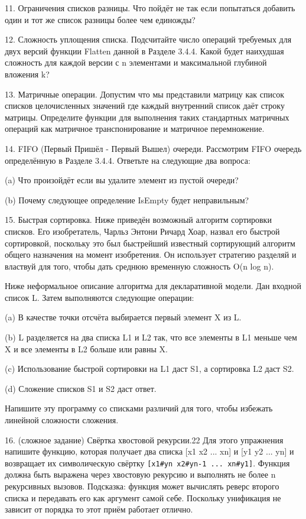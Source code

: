 11. Ограничения списков разницы. Что пойдёт не так если попытаться добавить один и тот же список разницы более чем единожды?

12. Сложность уплощения списка. Подсчитайте число операций требуемых для двух версий функции Flatten данной в Разделе 3.4.4. Какой будет наихудшая сложность для каждой версии с n элементами и максимальной глубиной вложения k?

13. Матричные операции. Допустим что мы представили матрицу как список списков целочисленных значений где каждый внутренний список даёт строку матрицы. Определите функции для выполнения таких стандартных матричных операций как матричное транспонирование и матричное перемножение.

14. FIFO (Первый Пришёл - Первый Вышел) очереди. Рассмотрим FIFO очередь определённую в Разделе 3.4.4. Ответьте на следующие два вопроса:

(a) Что произойдёт если вы удалите элемент из пустой очереди?

(b) Почему следующее определение IsEmpty будет неправильным?

15. Быстрая сортировка. Ниже приведён возможный алгоритм сортировки списков. Его изобретатель, Чарльз Энтони Ричард Хоар, назвал его быстрой сортировкой, поскольку это был быстрейший известный сортирующий алгоритм общего назначения на момент изобретения. Он использует стратегию разделяй и властвуй для того, чтобы дать среднюю временную сложность O(n log n).

Ниже неформальное описание алгоритма для декларативной модели. Дан входной список L. Затем выполняются следующие операции:

(a) В качестве точки отсчёта выбирается первый элемент X из L.

(b) L разделяется на два списка L1 и L2 так, что все элементы в L1 меньше чем X и все элементы в L2 больше или равны X.

(c) Использование быстрой сортировки на L1 даст S1, а сортировка L2 даст S2.

(d) Сложение списков S1 и S2 даст ответ.

Напишите эту программу со списками различий для того, чтобы избежать линейной сложности сложения.

16. (сложное задание) Свёртка хвостовой рекурсии.22 Для этого упражнения напишите функцию, которая получает два списка [x1 x2 ... xn] и [y1 y2 ... yn] и возвращает их символическую свёртку \verb![x1#yn x2#yn-1 ... xn#y1]!. Функция должна быть выражена через хвостовую рекурсию и выполнять не более n рекурсивных вызовов. Подсказка: функция может вычислять реверс второго списка и передавать его как аргумент самой себе. Поскольку унификация не зависит от порядка то этот приём работает отлично.

